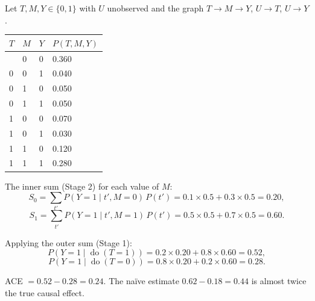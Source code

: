 \documentclass[
  a4paper,
]{book}
\newcounter{none} %
\newcommand{\doop}{\operatorname{do}}
\begin{document}
\begin{tcolorbox}[enhanced jigsaw, arc=.35mm, bottomrule=.15mm, bottomtitle=1mm, breakable, colback=white, colbacktitle=quarto-callout-note-color!10!white, colframe=quarto-callout-note-color-frame, coltitle=black, left=2mm, leftrule=.75mm, opacityback=0, opacitybacktitle=0.6, rightrule=.15mm, title={Example: Front-Door Formula --- Binary Numerical Computation}, titlerule=0mm, toprule=.15mm, toptitle=1mm]

Let \(T, M, Y \in \{0, 1\}\) with \(U\) unobserved and the graph
\(T \to M \to Y\), \(U \to T\), \(U \to Y\).

{\def\LTcaptype{none} %
\begin{longtable}[]{@{}llll@{}}
\toprule\noalign{}
\(T\) & \(M\) & \(Y\) & \(P(T,M,Y)\) \\
\midrule\noalign{}
\endhead
\bottomrule\noalign{}
\endlastfoot
0 & 0 & 0 & 0.360 \\
0 & 0 & 1 & 0.040 \\
0 & 1 & 0 & 0.050 \\
0 & 1 & 1 & 0.050 \\
1 & 0 & 0 & 0.070 \\
1 & 0 & 1 & 0.030 \\
1 & 1 & 0 & 0.120 \\
1 & 1 & 1 & 0.280 \\
\end{longtable}
}

The inner sum (Stage 2) for each value of \(M\):
\[S_0 = \sum_{t'} P(Y{=}1 \mid t', M{=}0)\,P(t') = 0.1 \times 0.5 + 0.3 \times 0.5 = 0.20,\]
\[S_1 = \sum_{t'} P(Y{=}1 \mid t', M{=}1)\,P(t') = 0.5 \times 0.5 + 0.7 \times 0.5 = 0.60.\]

Applying the outer sum (Stage 1):
\[P(Y{=}1 \mid \doop(T{=}1)) = 0.2 \times 0.20 + 0.8 \times 0.60 = 0.52,\]
\[P(Y{=}1 \mid \doop(T{=}0)) = 0.8 \times 0.20 + 0.2 \times 0.60 = 0.28.\]

ACE \(= 0.52 - 0.28 = 0.24\). The naïve estimate \(0.62 - 0.18 = 0.44\)
is almost twice the true causal effect.

\end{tcolorbox}
\end{document}
